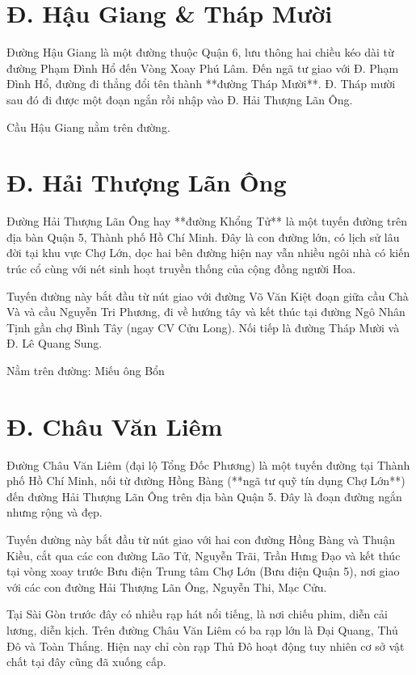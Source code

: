 \section{Đ. Hậu Giang \& Tháp Mười}

Đường Hậu Giang là một đường thuộc Quận 6, lưu thông hai chiều kéo dài từ đường Phạm Đình Hổ đến Vòng Xoay Phú Lâm. Đến ngã tư giao với Đ. Phạm Đình Hổ, đường đi thẳng đổi tên thành **đường Tháp Mười**. Đ. Tháp mười sau đó đi được một đoạn ngắn rồi nhập vào Đ. Hải Thượng Lãn Ông.

Cầu Hậu Giang nằm trên đường.

\section{Đ. Hải Thượng Lãn Ông}

Đường Hải Thượng Lãn Ông hay **đường Khổng Tử** là một tuyến đường trên địa bàn Quận 5, Thành phố Hồ Chí Minh. Đây là con đường lớn, có lịch sử lâu đời tại khu vực Chợ Lớn, dọc hai bên đường hiện nay vẫn nhiều ngôi nhà có kiến trúc cổ cùng với nét sinh hoạt truyền thống của cộng đồng người Hoa.

Tuyến đường này bắt đầu từ nút giao với đường Võ Văn Kiệt đoạn giữa cầu Chà Và và cầu Nguyễn Tri Phương, đi về hướng tây và kết thúc tại đường Ngô Nhân Tịnh gần chợ Bình Tây (ngay CV Cửu Long). Nối tiếp là đường Tháp Mười và Đ. Lê Quang Sung.

Nằm trên đường: Miếu ông Bổn

\section{Đ. Châu Văn Liêm}

Đường Châu Văn Liêm (đại lộ Tổng Đốc Phương) là một tuyến đường tại Thành phố Hồ Chí Minh, nối từ đường Hồng Bàng (**ngã tư quỹ tín dụng Chợ Lớn**) đến đường Hải Thượng Lãn Ông trên địa bàn Quận 5. Đây là đoạn đường ngắn nhưng rộng và đẹp.

Tuyến đường này bắt đầu từ nút giao với hai con đường Hồng Bàng và Thuận Kiều, cắt qua các con đường Lão Tử, Nguyễn Trãi, Trần Hưng Đạo và kết thúc tại vòng xoay trước Bưu điện Trung tâm Chợ Lớn (Bưu điện Quận 5), nơi giao với các con đường Hải Thượng Lãn Ông, Nguyễn Thi, Mạc Cửu.

Tại Sài Gòn trước đây có nhiều rạp hát nổi tiếng, là nơi chiếu phim, diễn cải lương, diễn kịch. Trên đường Châu Văn Liêm có ba rạp lớn là Đại Quang, Thủ Đô và Toàn Thắng. Hiện nay chỉ còn rạp Thủ Đô hoạt động tuy nhiên cơ sở vật chất tại đây cũng đã xuống cấp.

